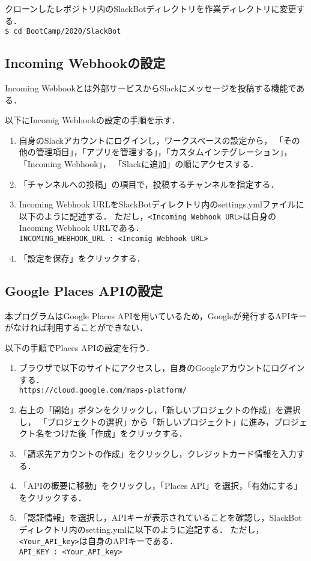 \documentclass[12pt]{jsarticle}
\begin{document}
クローンしたレポジトリ内のSlackBotディレクトリを作業ディレクトリに変更する．\\
\verb|$ cd BootCamp/2020/SlackBot|

\subsection{Incoming Webhookの設定}
Incoming Webhookとは外部サービスからSlackにメッセージを投稿する機能である．

以下にIncomig Webhookの設定の手順を示す．
\begin{enumerate}
  \item 自身のSlackアカウントにログインし，ワークスペースの設定から，
       「その他の管理項目」，「アプリを管理する」，「カスタムインテグレーション」，「Incoming Webhook」，
       「Slackに追加」の順にアクセスする．
  \item 「チャンネルへの投稿」の項目で，投稿するチャンネルを指定する．
  \item Incoming Webhook URLをSlackBotディレクトリ内のsettings.ymlファイルに以下のように記述する．
        ただし，\verb|<Incoming Webhook URL>|は自身のIncoming Webhook URLである．\\
        \verb|INCOMING_WEBHOOK_URL : <Incomig Webhook URL> |
  \item 「設定を保存」をクリックする．
\end{enumerate}


\subsection{Google Places APIの設定}
本プログラムはGoogle Places APIを用いているため，Googleが発行するAPIキーがなければ利用することができない．

以下の手順でPlaces APIの設定を行う．
\begin{enumerate}
\item ブラウザで以下のサイトにアクセスし，自身のGoogleアカウントにログインする．\\
      \verb|https://cloud.google.com/maps-platform/|
\item 右上の「開始」ボタンをクリックし，「新しいプロジェクトの作成」を選択し，
     「プロジェクトの選択」から「新しいプロジェクト」に進み，プロジェクト名をつけた後「作成」をクリックする．
\item 「請求先アカウントの作成」をクリックし，クレジットカード情報を入力する．
\item 「APIの概要に移動」をクリックし，「Places API」を選択，「有効にする」をクリックする．
\item 「認証情報」を選択し，APIキーが表示されていることを確認し，SlackBotディレクトリ内のsetting.ymlに以下のように追記する．
      ただし，\verb|<Your_API_key>|は自身のAPIキーである．\\
       \verb|API_KEY : <Your_API_key>|
\end{enumerate}
\end{document}

